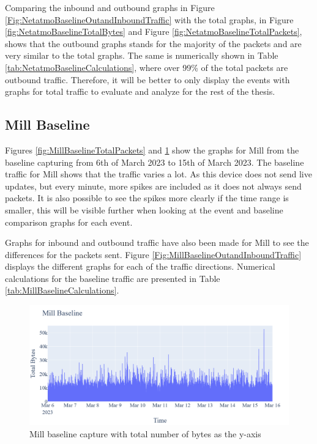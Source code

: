 Comparing the inbound and outbound graphs in Figure \ref{Fig:NetatmoBaselineOutandInboundTraffic} with the total graphs, in Figure \ref{fig:NetatmoBaselineTotalBytes} and Figure \ref{fig:NetatmoBaselineTotalPackets}, shows that the outbound graphs stands for the majority of the packets and are very similar to the total graphs. The same is numerically shown in Table \ref{tab:NetatmoBaselineCalculations}, where over 99\% of the total packets are outbound traffic. Therefore, it will be better to only display the events with graphs for total traffic to evaluate and analyze for the rest of the thesis. 

\subsection{Mill Baseline}
Figures \ref{fig:MillBaselineTotalPackets} and \ref{fig:MillBaselineTotalBytes} show the graphs for Mill from the baseline capturing from 6th of March 2023 to 15th of March 2023. The baseline traffic for Mill shows that the traffic varies a lot. As this device does not send live updates, but every minute, more spikes are included as it does not always send packets. It is also possible to see the spikes more clearly if the time range is smaller, this will be visible further when looking at the event and baseline comparison graphs for each event. 

Graphs for inbound and outbound traffic have also been made for Mill to see the differences for the packets sent. Figure \ref{Fig:MillBaselineOutandInboundTraffic} displays the different graphs for each of the traffic directions. Numerical calculations for the baseline traffic are presented in Table \ref{tab:MillBaselineCalculations}. 
\begin{figure} [H]
    \centering
    \includegraphics[scale=0.25]{figures/Mill_Baseline_TotalBytes.png}
    \caption{Mill baseline capture with total number of bytes as the y-axis}
    \label{fig:MillBaselineTotalBytes}
\end{figure}

